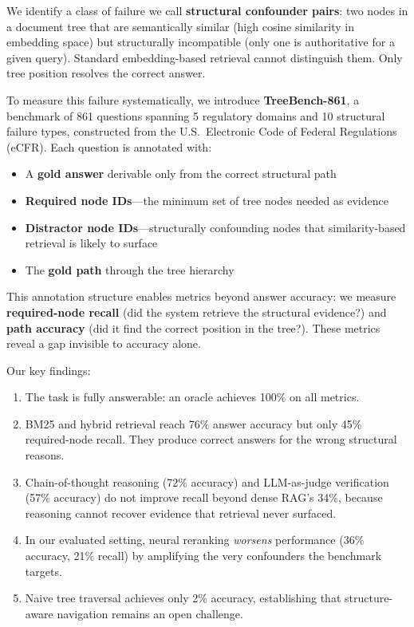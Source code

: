 \documentclass[11pt]{article}
\begin{document}
We identify a class of failure we call \textbf{structural confounder pairs}: two nodes in a document tree that are semantically similar (high cosine similarity in embedding space) but structurally incompatible (only one is authoritative for a given query). Standard embedding-based retrieval cannot distinguish them. Only tree position resolves the correct answer.

To measure this failure systematically, we introduce \textbf{TreeBench-861}, a benchmark of 861 questions spanning 5 regulatory domains and 10 structural failure types, constructed from the U.S.\ Electronic Code of Federal Regulations (eCFR). Each question is annotated with:
\begin{itemize}[nosep]
    \item A \textbf{gold answer} derivable only from the correct structural path
    \item \textbf{Required node IDs}---the minimum set of tree nodes needed as evidence
    \item \textbf{Distractor node IDs}---structurally confounding nodes that similarity-based retrieval is likely to surface
    \item The \textbf{gold path} through the tree hierarchy
\end{itemize}

This annotation structure enables metrics beyond answer accuracy: we measure \textbf{required-node recall} (did the system retrieve the structural evidence?) and \textbf{path accuracy} (did it find the correct position in the tree?). These metrics reveal a gap invisible to accuracy alone.

Our key findings:
\begin{enumerate}[nosep]
    \item The task is fully answerable: an oracle achieves 100\% on all metrics.
    \item BM25 and hybrid retrieval reach 76\% answer accuracy but only 45\% required-node recall. They produce correct answers for the wrong structural reasons.
    \item Chain-of-thought reasoning (72\% accuracy) and LLM-as-judge verification (57\% accuracy) do not improve recall beyond dense RAG's 34\%, because reasoning cannot recover evidence that retrieval never surfaced.
    \item In our evaluated setting, neural reranking \emph{worsens} performance (36\% accuracy, 21\% recall) by amplifying the very confounders the benchmark targets.
    \item Naive tree traversal achieves only 2\% accuracy, establishing that structure-aware navigation remains an open challenge.
\end{enumerate}
\end{document}
